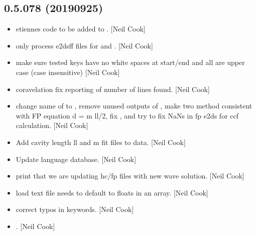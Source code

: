 \documentclass[a4paper,10pt,english]{report}
\begin{document}
\subsection{0.5.078 (2019\sphinxhyphen{}09\sphinxhyphen{}25)}
\label{\detokenize{misc/changelog:id84}}\begin{itemize}
\item {} 
 \sphinxhyphen{} etiennes code to be added to .
{[}Neil Cook{]}

\item {} 
 \sphinxhyphen{} only process e2dsff files for  and
. {[}Neil Cook{]}

\item {} 
 \sphinxhyphen{} make sure tested keys have no white spaces at
start/end and all are upper case (case insensitive) {[}Neil Cook{]}

\item {} 
 \sphinxhyphen{} coravelation \sphinxhyphen{} fix reporting of number
of lines found. {[}Neil Cook{]}

\item {} 
 \sphinxhyphen{} change name of  to
, remove unused outputs of ,
make two method consistent with FP equation d = m \sphinxtitleref{*} ll/2, fix
, and try to fix NaNs in fp e2ds for ccf
calculation. {[}Neil Cook{]}

\item {} 
Add cavity length ll and m fit files to data. {[}Neil Cook{]}

\item {} 
Update language database. {[}Neil Cook{]}

\item {} 
 \sphinxhyphen{} print that we are updating hc/fp
files with new wave solution. {[}Neil Cook{]}

\item {} 
 \sphinxhyphen{} load text file needs to default to floats in an
array. {[}Neil Cook{]}

\item {} 
 \sphinxhyphen{} correct typos in
keywords. {[}Neil Cook{]}

\item {} 
 \sphinxhyphen{} .
{[}Neil Cook{]}

\end{itemize}
\end{document}
